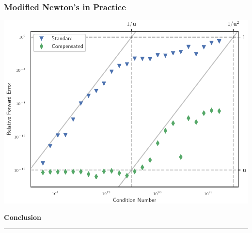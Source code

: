 \documentclass{beamer}
\begin{document}
\begin{frame}
\frametitle{Modified Newton's in Practice}
\begin{center}
\includegraphics[height=0.8\textheight]{../images/slides/almost_tangent.pdf}
\end{center}
\end{frame}


\begin{frame}
\centering
{\Large \bf Conclusion}
\rule{0.82\textwidth}{1pt}
\end{frame}
\end{document}
